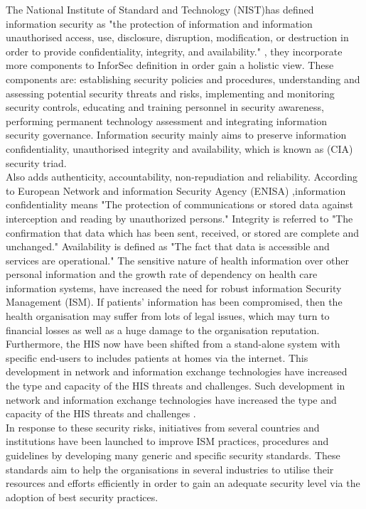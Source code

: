 The National Institute of Standard and Technology (NIST)\cite{Kissel2013}has defined information security as "the protection of information and information unauthorised access, use, disclosure, disruption, modification, or destruction in order to provide confidentiality, integrity, and availability." \citet{Zafar2009}, they incorporate more components to InforSec definition in order gain a holistic view. These components are: establishing security policies and procedures, understanding and assessing potential security threats and risks, implementing and monitoring security controls, educating and training personnel in security awareness, performing permanent technology assessment and integrating information security governance. Information security mainly aims to preserve information confidentiality, unauthorised integrity and availability, which is known as (CIA) security triad\cite{pfleeger2007security}.\\
Also \cite{ISO/IEC2014} adds authenticity, accountability, non-repudiation and reliability. According to European Network and information Security Agency (ENISA) \cite{ENISA2006},information confidentiality means "The protection of communications or stored data against interception and reading by unauthorized persons." Integrity is referred to "The confirmation that data which has been sent, received, or stored are complete and unchanged." Availability is defined as "The fact that data is accessible and services are operational."
The sensitive nature of health information over other personal information and the growth rate of dependency on health care information systems, have increased the need for robust information Security Management (ISM). If patients' information has been compromised, then the health organisation may suffer from lots of legal issues, which may turn to financial losses as well as a huge damage to the organisation reputation. Furthermore, the HIS now have been shifted from a stand-alone system with specific end-users to includes patients at homes via the internet. This development in network and information exchange technologies have increased the type and capacity of the HIS threats and challenges. Such development in network and information exchange technologies have increased the type and capacity of the HIS threats and challenges \cite{Hsu}. \\
In response to these security risks, initiatives from several countries and institutions have been launched to improve ISM practices, procedures and guidelines by developing many generic and specific security standards. These standards aim to help the organisations in several industries to utilise their resources and efforts efficiently in order to gain an adequate security level via the adoption of best security practices\cite{Rahim2016,Akowuah2013}.

